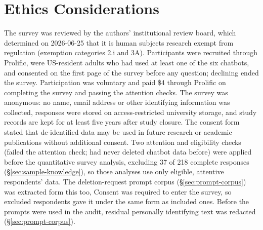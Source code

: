 \documentclass[conference,compsoc]{IEEEtran}
\begin{document}
\section*{Ethics Considerations}
The survey was reviewed by the authors' institutional review board, which
determined on 2026-06-25 that it is human subjects research exempt from
regulation (exemption categories 2.i and 3A). Participants were recruited through Prolific, were
US-resident adults who had used at least one of the six chatbots, and
consented on the first page of the survey before any question; declining
ended the survey. Participation was voluntary and paid \$4 through
Prolific on completing the survey and passing the attention checks. The
survey was anonymous: no name, email address or other identifying
information was collected, responses were stored on access-restricted
university storage, and study records are kept for at least five years after
study closure. The consent form stated that de-identified data may be used
in future research or academic publications without additional consent.
Two attention and eligibility checks (failed the attention check; had never
deleted chatbot data before) were applied before the quantitative survey
analysis, excluding 37 of 218 complete responses
(\S\ref{sec:sample-knowledge}), so those analyses use only eligible,
attentive respondents' data. The deletion-request prompt corpus
(\S\ref{sec:prompt-corpus}) was extracted form this too, 
Consent was required to enter the survey, so excluded respondents gave it
under the same form as included ones. Before the prompts were used in the
audit, residual personally identifying text was redacted (\S\ref{sec:prompt-corpus}).
\end{document}
